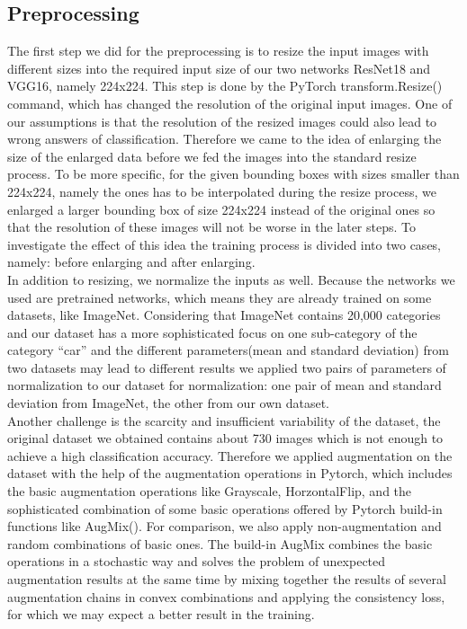 \documentclass[lang=english,inputenc=utf8,fontsize=10pt]{ldvarticle}
\begin{document}
\subsection{Preprocessing}
The first step we did for the preprocessing is to resize the input images with different sizes into the required input size of our two networks ResNet18 and VGG16, namely 224x224. This step is done by the PyTorch transform.Resize() command, which has changed the resolution of the original input images. One of our assumptions is that the resolution of the resized images could also lead to wrong answers of classification. Therefore we came to the idea of enlarging the size of the enlarged data before we fed the images into the standard resize process. To be more specific, for the given bounding boxes with sizes smaller than 224x224, namely the ones has to be interpolated during the resize process, we enlarged a larger bounding box of size 224x224 instead of the original ones so that the resolution of these images will not be worse in the later steps. To investigate the effect of this idea the training process is divided into two cases, namely: before enlarging and after enlarging.\\

In addition to resizing, we normalize the inputs as well. Because the networks we used are pretrained networks, which means they are already trained on some datasets, like ImageNet. Considering that ImageNet contains 20,000 categories and our dataset has a more sophisticated focus on one sub-category of the category “car” and the different parameters(mean and standard deviation) from two datasets may lead to different results we applied two pairs of parameters of normalization to our dataset for normalization: one pair of mean and standard deviation from ImageNet, the other from our own dataset.\\

Another challenge is the scarcity and insufficient variability of the dataset, the original dataset we obtained contains about 730 images which is not enough to achieve a high classification accuracy. Therefore we applied augmentation on the dataset with the help of the augmentation operations in Pytorch, which includes the basic augmentation operations like Grayscale, HorzontalFlip, and the sophisticated combination of some basic operations offered by Pytorch build-in functions like AugMix(). For comparison, we also apply non-augmentation and random combinations of basic ones. The build-in AugMix combines the basic operations in a stochastic way and solves the problem of unexpected augmentation results at the same time by mixing together the results of several augmentation chains in convex combinations and applying the consistency loss, for which we may expect a better result in the training.\\
\end{document}
